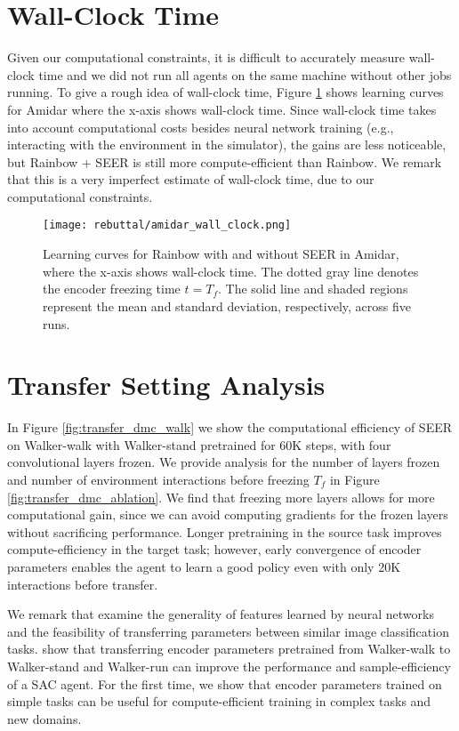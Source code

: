 \documentclass{article}
\begin{document}
\section{Wall-Clock Time} \label{appendix:wall_clock_time}

Given our computational constraints, it is difficult to accurately measure wall-clock time and we did not run all agents on the same machine without other jobs running. To give a rough idea of wall-clock time, Figure \ref{fig:wall_clock} shows learning curves for Amidar where the x-axis shows wall-clock time. Since wall-clock time takes into account computational costs besides neural network training (e.g., interacting with the environment in the simulator), the gains are less noticeable, but Rainbow + SEER is still more compute-efficient than Rainbow. We remark that this is a very imperfect estimate of wall-clock time, due to our computational constraints.

\begin{figure} [t] \centering
\texttt{[image: rebuttal/amidar\_wall\_clock.png]}
\caption{Learning curves for Rainbow with and without SEER in Amidar, where the x-axis shows wall-clock time. The dotted gray line denotes the encoder freezing time $t=T_f$. The solid line and shaded regions represent the mean and standard deviation, respectively, across five runs.} \label{fig:wall_clock}
\end{figure}


\section{Transfer Setting Analysis} \label{appendix:additional_transfer_dmc}
In Figure \ref{fig:transfer_dmc_walk} we show the computational efficiency of SEER on Walker-walk with Walker-stand pretrained for 60K steps, with four convolutional layers frozen. We provide analysis for the number of layers frozen and number of environment interactions before freezing $T_f$ in Figure \ref{fig:transfer_dmc_ablation}. We find that freezing more layers allows for more computational gain, since we can avoid computing gradients for the frozen layers without sacrificing performance. Longer pretraining in the source task improves compute-efficiency in the target task; however, early convergence of encoder parameters enables the agent to learn a good policy even with only 20K interactions before transfer.

We remark that \citet{yosinski2014transferable} examine the generality of features learned by neural networks and the feasibility of transferring parameters between similar image classification tasks. \citet{yarats2019improving} show that transferring encoder parameters pretrained from Walker-walk to Walker-stand and Walker-run can improve the performance and sample-efficiency of a SAC agent. For the first time, we show that encoder parameters trained on simple tasks can be useful for compute-efficient training in complex tasks and new domains. 
\end{document}
